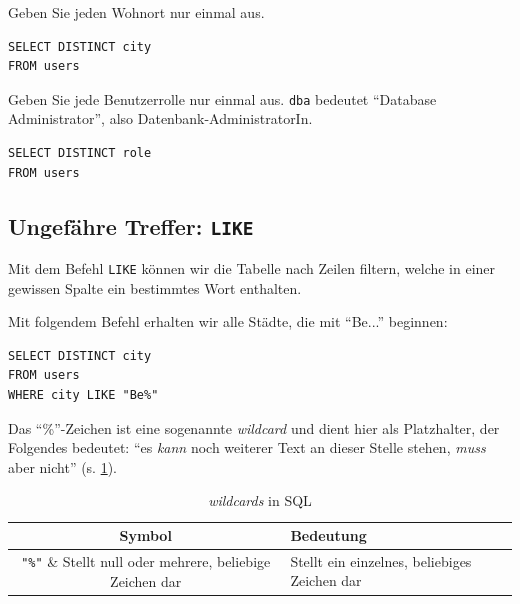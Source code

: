 \begin{myexercise}
  Geben Sie jeden Wohnort nur einmal aus.
  \begin{myanswer}
    \begin{lstlisting}[style=sql]
SELECT DISTINCT city 
FROM users
\end{lstlisting}
  \end{myanswer}
\end{myexercise}
\begin{myexercise}
  Geben Sie jede Benutzerrolle nur einmal aus. \texttt{dba} bedeutet ``Database Administrator'', also Datenbank-AdministratorIn.
  \begin{myanswer}
    \begin{lstlisting}[style=sql]
SELECT DISTINCT role
FROM users
\end{lstlisting}
  \end{myanswer}
\end{myexercise}


\subsection{Ungefähre Treffer: \texorpdfstring{\lstinline[style=sql]|LIKE|}{LIKE}}

Mit dem Befehl \lstinline[style=sql]|LIKE| können wir die Tabelle nach Zeilen filtern, welche in einer gewissen Spalte ein bestimmtes Wort enthalten.

\begin{myexample}
Mit folgendem Befehl erhalten wir alle Städte, die mit ``Be...'' beginnen:

\begin{lstlisting}[style=sql]
SELECT DISTINCT city 
FROM users 
WHERE city LIKE "Be%"
\end{lstlisting}
\end{myexample}

Das ``\%''-Zeichen ist eine sogenannte \textit{wildcard} und dient hier als Platzhalter, der Folgendes bedeutet: ``es \textit{kann} noch weiterer Text an dieser Stelle stehen, \textit{muss} aber nicht'' (s. \cref{table:wildcards}).

\begin{table}[ht]
  \centering
  \begin{tabular}{c|l}
    \textbf{Symbol}            & \textbf{Bedeutung}                              \\ \midrule
    \lstinline[style=sql]|"%"| & Stellt null oder mehrere, beliebige Zeichen dar \\ \hline
    \lstinline[style=sql]|"_"| & Stellt ein einzelnes, beliebiges Zeichen dar    \\
  \end{tabular}
  \caption{\textit{wildcards} in \gls{SQL}}
  \label{table:wildcards}
\end{table}

